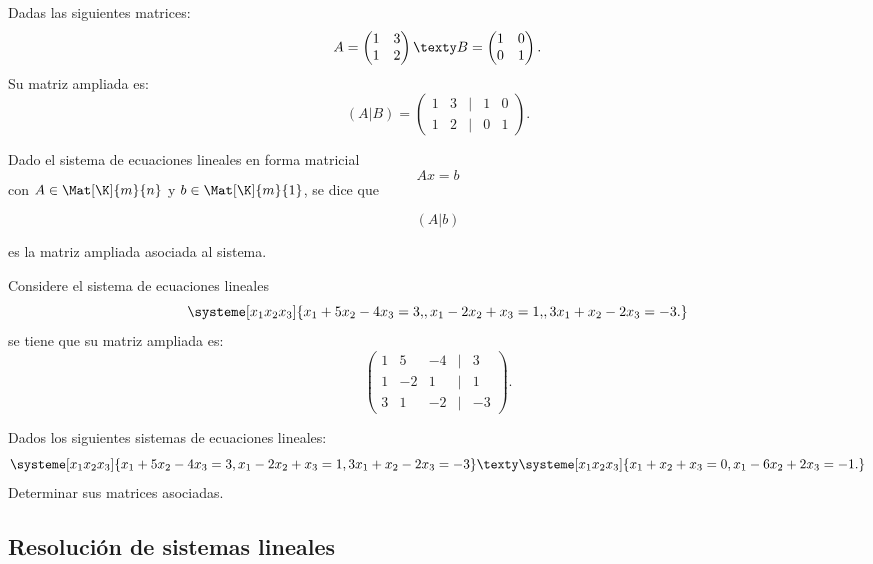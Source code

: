 \documentclass[compacto,10pt]{pubciencias-notas}
\begin{document}
\begin{ejem}\hspace{0pt} 
Dadas las siguientes matrices:
\[
    A=\begin{pmatrix}
        1 & 3\\
        1& 2
\end{pmatrix}
\texty
B=\begin{pmatrix}
        1 & 0\\
        0& 1
\end{pmatrix}.
\]
Su matriz ampliada es:
\[
    (A|B)=
    \begin{pmatrix}
    1& 3&|&1 & 0\\
    1& 2&|&0&1
    \end{pmatrix}.
\]
\end{ejem}
\begin{defi}
    Dado el sistema de ecuaciones lineales en forma matricial
    \[
        Ax=b
    \]
    con $A\in \Mat[\K]{m}{n}$ y $b\in\Mat[\K]{m}{1}$, se dice que 
    
    \[
        (A|b)
    \]
    
    es la matriz ampliada asociada al sistema.
\end{defi}

\begin{ejem}
\hspace{0pt} 
Considere el sistema de ecuaciones lineales 
\[
        \systeme[x_1 x_2 x_3]{x_1+5x_2-4x_3=3{,}, x_1-2x_2+x_3=1{,}, 3x_1+x_2-2x_3=-3.}
\]
se tiene que su matriz ampliada es:
\[
    \begin{pmatrix}
        1&5&-4&|&3\\
        1&-2&1&|&1\\
        3&1&-2&|&-3
        \end{pmatrix}.
\]
\end{ejem}

\begin{ejer}\hspace{0pt} 
Dados los siguientes sistemas de ecuaciones lineales:
  \[
        \systeme[x_1 x_2 x_3]{x_1+5x_2-4x_3=3, x_1-2x_2+x_3=1, 3x_1+x_2-2x_3=-3}
        \texty
        \systeme[x_1 x_2 x_3]{x_1+x_2+x_3=0, x_1-6x_2+2x_3=-1.}
    \]
Determinar sus matrices asociadas.    
\end{ejer}


\subsection{Resolución de sistemas lineales}
\end{document}
